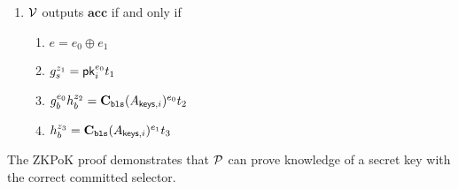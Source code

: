 \begin{Protocol*}[t!]
\begin{mdframed}
\begin{enumerate}
    \item $\mathcal{V}$ outputs $\textbf{acc}$ if and only if
    \begin{enumerate}
        \item $e=e_0\oplus{e_1}$
        \item $g_s^{z_1}=\mathsf{pk}_i^{e_0}t_1$ 
        \item $g_b^{e_0}h_b^{z_2}=\textbf{C}_\texttt{bls}(A_{\mathsf{keys},i})^{e_0}t_2$ 
        \item $h_b^{z_3}=\textbf{C}_\texttt{bls}(A_{\mathsf{keys},i})^{e_1}t_3$
    \end{enumerate} 
\end{enumerate} 
\end{mdframed}
\caption{The ZKPoK proof demonstrates that $\mathcal{P}$ can prove knowledge of a secret key with the correct committed selector.}\label{alg:zkpok}
\end{Protocol*}
    